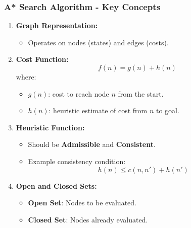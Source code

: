 \documentclass[aspectratio=169]{beamer}
\begin{document}
\begin{frame}[fragile]
    \frametitle{A* Search Algorithm - Key Concepts}
    \begin{enumerate}
        \item \textbf{Graph Representation:}
        \begin{itemize}
            \item Operates on nodes (states) and edges (costs).
        \end{itemize}
        
        \item \textbf{Cost Function:}
        \begin{equation}
        f(n) = g(n) + h(n)
        \end{equation}
        where:
        \begin{itemize}
            \item $g(n)$: cost to reach node $n$ from the start.
            \item $h(n)$: heuristic estimate of cost from $n$ to goal.
        \end{itemize}
        
        \item \textbf{Heuristic Function:}
        \begin{itemize}
            \item Should be \textbf{Admissible} and \textbf{Consistent}.
            \item Example consistency condition:
            \begin{equation}
            h(n) \leq c(n, n') + h(n')
            \end{equation}
        \end{itemize}
        
        \item \textbf{Open and Closed Sets:}
        \begin{itemize}
            \item \textbf{Open Set}: Nodes to be evaluated.
            \item \textbf{Closed Set}: Nodes already evaluated.
        \end{itemize}
    \end{enumerate}
\end{frame}
\end{document}
